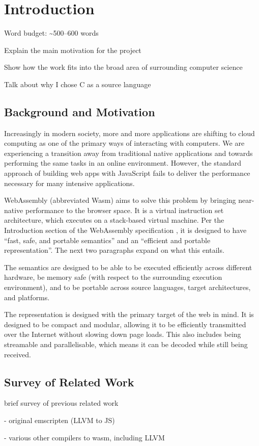\documentclass[00-main.tex]{subfiles}
\begin{document}
\chapter{Introduction}

\begin{mrwComment}
Word budget: \textasciitilde500--600 words
\end{mrwComment}

\begin{mrwComment}
Explain the main motivation for the project

Show how the work fits into the broad area of surrounding computer science
\end{mrwComment}

\begin{mrwComment}
Talk about why I chose C as a source language
\end{mrwComment}

\section{Background and Motivation}

Increasingly in modern society, more and more applications are shifting to cloud computing as one of the primary ways of interacting with computers.
We are experiencing a transition away from traditional native applications and towards performing the same tasks in an online environment.
However, the standard approach of building web apps with JavaScript fails to deliver the performance necessary for many intensive applications.

WebAssembly (abbreviated Wasm) aims to solve this problem by bringing near-native performance to the browser space.
It is a virtual instruction set architecture, which executes on a stack-based virtual machine.
Per the Introduction section of the WebAssembly specification , it is designed to have ``fast, safe, and portable semantics'' and an ``efficient and portable representation''.
The next two paragraphs expand on what this entails.

The semantics are designed to be able to be executed efficiently across different hardware, be memory safe (with respect to the surrounding execution environment), and to be portable across source languages, target architectures, and platforms.

The representation is designed with the primary target of the web in mind.
It is designed to be compact and modular, allowing it to be efficiently transmitted over the Internet without slowing down page loads.
This also includes being streamable and parallelisable, which means it can be decoded while still being received.



\section{Survey of Related Work}

\begin{mrwComment}
brief survey of previous related work

- original emscripten (LLVM to JS)

- various other compilers to wasm, including LLVM
\end{mrwComment}
\end{document}
